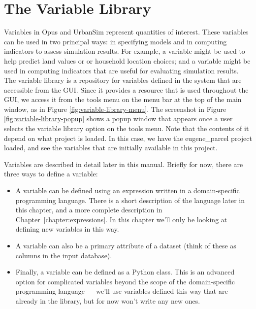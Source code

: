 \chapter{The Variable Library}
\label{chap:variable-library}

Variables in Opus and UrbanSim represent quantities of interest.  These
variables can be used in two principal ways: in specifying models and in
computing indicators to assess simulation results.  For example, a
 variable might be used to help predict land
values or or household location choices; and a 
variable might be used in computing indicators that are useful for
evaluating simulation results.  The variable library is a repository for
variables defined in the system that are accessible from the GUI\@.  Since
it provides a resource that is used throughout the GUI, we access it from
the tools menu on the menu bar at the top of the main window, as in Figure
\ref{fig:variable-library-menu}.  The screenshot in Figure
\ref{fig:variable-library-popup} shows a popup window that appears once a
user selects the variable library option on the tools menu.  Note that the
contents of it depend on what project is loaded.  In this case, we have the
eugene\_parcel project loaded, and see the variables that are initially
available in this project.

Variables are described in detail later in this manual.
Briefly for now, there are three ways to define a variable:

\begin{itemize}

\item A variable can be defined using an expression written in a
  domain-specific programming language.  There is a short description of
  the language later in this chapter, and a more complete description in
  Chapter~\ref{chapter:expressions}.  In this chapter 
  we'll only be looking at defining new variables in this way.

\item A variable can also be a primary attribute of a dataset (think of
  these as columns in the input database).

\item Finally, a variable can be defined as a Python class.  This is an
  advanced option for complicated variables beyond the scope of the
  domain-specific programming language --- we'll use variables defined this
  way that are already in the library, but for now won't write any new ones.

\end{itemize}

